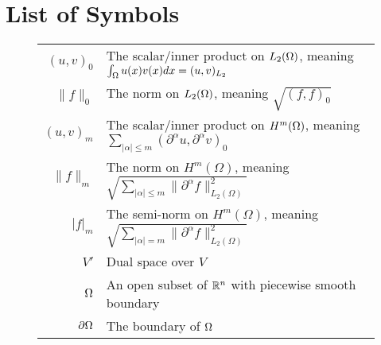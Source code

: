 \section*{List of Symbols}
\begin{center}
\begin{figure}[ht!]
\setlength{\extrarowheight}{10pt}
\begin{tabularx}{\textwidth}{rX}
$(u,v)_0$ &   The scalar/inner product on $L_2(\Omega)$, meaning $\int_\Omega u(x)v(x) dx =(u,v)_{L_2}$ \\
$\|f\|_0$ & The norm on $L_2(\Omega)$, meaning $\sqrt{(f,f)_0}$ \\
$(u,v)_m$ & The scalar/inner product on $H^m(\Omega)$, meaning $ \sum_{|\alpha|\leq m}(\partial ^{\alpha}u, \partial ^{\alpha} v)_0 $\\
$\|f\|_m$ & The norm on $H^m(\Omega)$, meaning $\sqrt{\sum_{|\alpha|\leq m}\|\partial ^\alpha f\|_{L_2(\Omega)}^2}$ \\
$|f|_m$ & The semi-norm on $H^m(\Omega)$, meaning $\sqrt{\sum_{|\alpha|= m}\|\partial ^\alpha f\|_{L_2(\Omega)}^2}$ \\
$V'$ & Dual space over $V$\\
$\Omega$ & An open subset of $\mathbb{R}^n$ with piecewise smooth boundary \\
$\partial\Omega$ & The boundary of $\Omega$\\
\end{tabularx}
\end{figure}
\end{center}
\vfill
